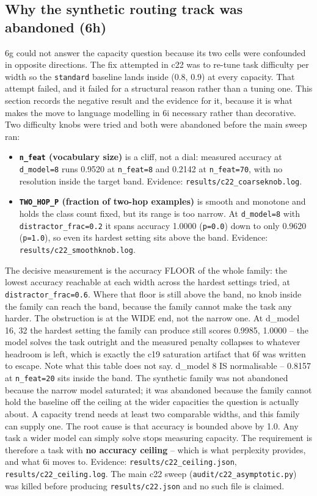 \documentclass[sn-nature,pdflatex]{sn-jnl}
\begin{document}
\subsection{Why the synthetic routing track was abandoned (6h)}
6g could not answer the capacity question because its two cells were confounded in opposite directions. The fix attempted in c22 was to re-tune task difficulty per width so the \texttt{standard} baseline lands inside (0.8, 0.9) at every capacity. That attempt failed, and it failed for a structural reason rather than a tuning one. This section records the negative result and the evidence for it, because it is what makes the move to language modelling in 6i necessary rather than decorative.
Two difficulty knobs were tried and both were abandoned before the main sweep ran:
\begin{itemize}
\item \textbf{\texttt{n\_feat} (vocabulary size)} is a cliff, not a dial: measured accuracy at \texttt{d\_model=8} runs 0.9520 at \texttt{n\_feat=8} and 0.2142 at \texttt{n\_feat=70}, with no resolution inside the target band. Evidence: \texttt{results/c22\_coarseknob.log}.
\item \textbf{\texttt{TWO\_HOP\_P} (fraction of two-hop examples)} is smooth and monotone and holds the class count fixed, but its range is too narrow. At \texttt{d\_model=8} with \texttt{distractor\_frac=0.2} it spans accuracy 1.0000 (\texttt{p=0.0}) down to only 0.9620 (\texttt{p=1.0}), so even its hardest setting sits above the band. Evidence: \texttt{results/c22\_smoothknob.log}.
\end{itemize}
The decisive measurement is the accuracy FLOOR of the whole family: the lowest accuracy reachable at each width across the hardest settings tried, at \texttt{distractor\_frac=0.6}. Where that floor is still above the band, no knob inside the family can reach the band, because the family cannot make the task any harder.
The obstruction is at the WIDE end, not the narrow one. At d\_model 16, 32 the hardest setting the family can produce still scores 0.9985, 1.0000 -- the model solves the task outright and the measured penalty collapses to whatever headroom is left, which is exactly the c19 saturation artifact that 6f was written to escape.
Note what this table does not say. d\_model 8 IS normalisable -- 0.8157 at \texttt{n\_feat=20} sits inside the band. The synthetic family was not abandoned because the narrow model saturated; it was abandoned because the family cannot hold the baseline off the ceiling at the wider capacities the question is actually about. A capacity trend needs at least two comparable widths, and this family can supply one.
The root cause is that accuracy is bounded above by 1.0. Any task a wider model can simply solve stops measuring capacity. The requirement is therefore a task with \textbf{no accuracy ceiling} -- which is what perplexity provides, and what 6i moves to.
Evidence: \texttt{results/c22\_ceiling.json}, \texttt{results/c22\_ceiling.log}. The main c22 sweep (\texttt{audit/c22\_asymptotic.py}) was killed before producing \texttt{results/c22.json} and no such file is claimed.
\end{document}
